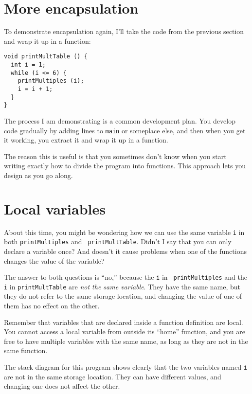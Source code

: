 \section{More encapsulation}

To demonstrate encapsulation again, I'll take the code
from the previous section and wrap it up in a function:

\begin{verbatim}
void printMultTable () {
  int i = 1;
  while (i <= 6) {
    printMultiples (i);
    i = i + 1;
  }
}
\end{verbatim}
%
The process I am demonstrating is a common 
development plan.  You develop code gradually by adding
lines to {\tt main} or someplace else, and then when you get
it working, you extract it and wrap it up in a function.

The reason this is useful is that you sometimes don't know
when you start writing exactly how to divide the program into
functions.  This approach lets you design as you go along.

\section{Local variables}

About this time, you might be wondering how we can use the same
variable {\tt i} in both {\tt printMultiples} and {\tt
printMultTable}.  Didn't I say that you can only declare a variable
once?  And doesn't it cause problems when one of the functions changes
the value of the variable?

The answer to both questions is ``no,'' because the {\tt i} in {\tt
printMultiples} and the {\tt i} in {\tt printMultTable} are
{\em not the same variable}.  They have the same name, but
they do not refer to the same storage location, and changing
the value of one of them has no effect on the other.


Remember that variables that are declared inside a function definition
are local.  You cannot access a local variable from outside its
``home'' function, and you are free to have multiple variables with
the same name, as long as they are not in the same function.

The stack diagram for this program shows clearly that the
two variables named {\tt i} are not in the same storage location.
They can have different values, and changing one does not affect
the other.

